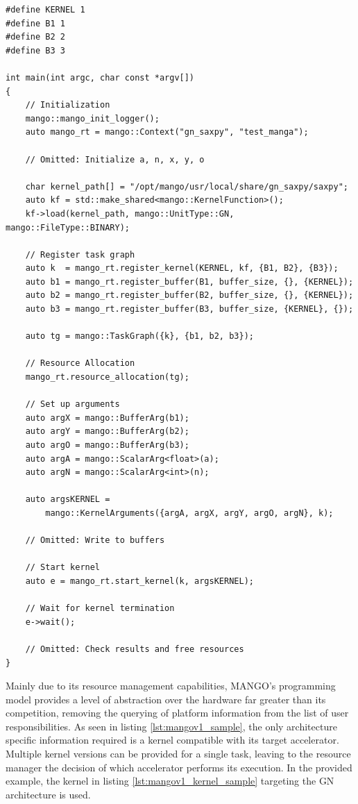 \begin{lstlisting}[style=CStyle, caption=MANGO saxpy example (host), floatplacement=H, label={lst:mangov1_sample}]
#define KERNEL 1
#define B1 1
#define B2 2
#define B3 3

int main(int argc, char const *argv[])
{
    // Initialization
    mango::mango_init_logger();
    auto mango_rt = mango::Context("gn_saxpy", "test_manga");

    // Omitted: Initialize a, n, x, y, o

    char kernel_path[] = "/opt/mango/usr/local/share/gn_saxpy/saxpy";
    auto kf = std::make_shared<mango::KernelFunction>();
    kf->load(kernel_path, mango::UnitType::GN, mango::FileType::BINARY);

    // Register task graph
    auto k  = mango_rt.register_kernel(KERNEL, kf, {B1, B2}, {B3});
    auto b1 = mango_rt.register_buffer(B1, buffer_size, {}, {KERNEL});
    auto b2 = mango_rt.register_buffer(B2, buffer_size, {}, {KERNEL});
    auto b3 = mango_rt.register_buffer(B3, buffer_size, {KERNEL}, {});

    auto tg = mango::TaskGraph({k}, {b1, b2, b3});

    // Resource Allocation
    mango_rt.resource_allocation(tg);

    // Set up arguments
    auto argX = mango::BufferArg(b1);
    auto argY = mango::BufferArg(b2);
    auto argO = mango::BufferArg(b3);
    auto argA = mango::ScalarArg<float>(a);
    auto argN = mango::ScalarArg<int>(n);

    auto argsKERNEL = 
        mango::KernelArguments({argA, argX, argY, argO, argN}, k);

    // Omitted: Write to buffers

    // Start kernel
    auto e = mango_rt.start_kernel(k, argsKERNEL);

    // Wait for kernel termination
    e->wait();

    // Omitted: Check results and free resources
}
\end{lstlisting}

Mainly due to its resource management capabilities, MANGO's programming model provides a level of abstraction over the hardware far greater than its competition, removing the querying of platform information from the list of user responsibilities. 
As seen in listing \ref{lst:mangov1_sample}, the only architecture specific information required is a kernel compatible with its target accelerator. Multiple kernel versions can be provided for a single task, leaving to the resource manager the decision of which accelerator performs its execution. In the provided example, the kernel in listing \ref{lst:mangov1_kernel_sample} targeting the GN architecture is used. 

